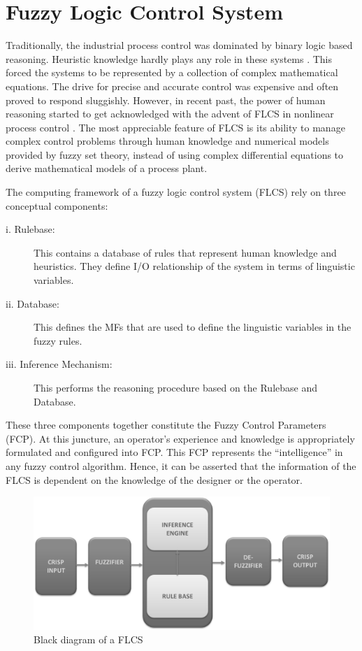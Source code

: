 \section{Fuzzy Logic Control System}
Traditionally, the industrial process control was dominated by binary logic based reasoning. Heuristic knowledge hardly plays any role in these systems \cite{bookBehera2009,bookMichels2006}. This forced the systems to be represented by a collection of complex mathematical equations. The drive for precise and accurate control was expensive and often proved to respond sluggishly. However, in recent past, the power of human reasoning started to get acknowledged with the advent of FLCS in nonlinear process control \cite{Zadeh1993,Mendel1995,Sugeno1985,Mendel2000}. The most appreciable feature of FLCS is its ability to manage complex control problems through human knowledge and numerical models provided by fuzzy set theory, instead of using complex differential equations to derive mathematical models of  a process plant.

The computing framework of a fuzzy logic control system (FLCS) rely on three conceptual components:
\begin{description}
	\item[i. Rulebase:] This contains a database of rules that represent human knowledge and heuristics. They define I/O relationship of the system in terms of linguistic variables.
	\item[ii. Database:] This defines the MFs that are used to define the linguistic variables in the fuzzy rules. 
	\item[iii. Inference Mechanism:] This performs the reasoning procedure based on the Rulebase and Database.
\end{description}
These three components together constitute the Fuzzy Control Parameters (FCP). At this juncture, an operator's experience and knowledge is appropriately formulated and configured into FCP. This FCP represents the ``intelligence'' in any fuzzy control algorithm. Hence, it can be asserted that the information of the FLCS is dependent on the knowledge of the designer or the operator.

\begin{figure}[t!]
	\centering
	\includegraphics[width=0.9\linewidth]{Chapter1/chapter1/Fig1_FLCS}
	\caption{Black diagram of a FLCS}
	\label{fig:Fig1_1}
\end{figure}


